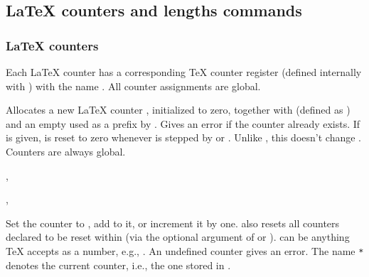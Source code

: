 \documentclass{l3in2edoc}
\begin{document}

\subsection{\LaTeX{} counters and lengths commands}

\subsubsection{\LaTeX{} counters}

Each \LaTeX{} counter  has a corresponding \TeX{} counter
register (defined internally with ) with the name
. All counter assignments are global.

\begin{function}[user]
  {
    \newcounter
  }
  \begin{syntax}
      
  \end{syntax}
  Allocates a new \LaTeX{} counter , initialized to zero,
  together with  (defined as
  ) and an empty  used as a
  prefix by . Gives an error if the counter already exists. If
   is given,  is reset to zero whenever
   is stepped by  or
  . Unlike , this doesn't change
  . Counters are always global.
\end{function}

\begin{function}[user]
  {
    \setcounter,
    \addtocounter,
    \stepcounter
  }
  \begin{syntax}
      
      
     
  \end{syntax}
  Set the counter  to , add 
  to it, or increment it by one.  also resets all
  counters declared to be reset within  (via the optional
  argument of  or ). 
  can be anything \TeX{} accepts as a number, e.g., .
  An undefined counter gives an error. The name \texttt{*} denotes the
  current counter, i.e., the one stored in .
\end{function}
\end{document}
